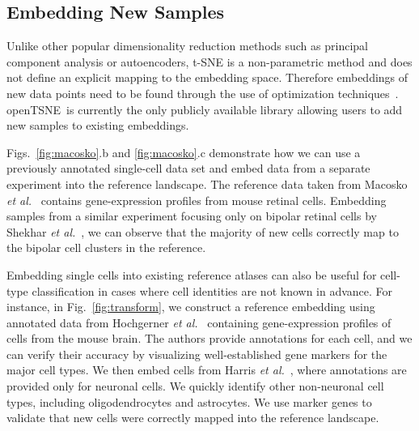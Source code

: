 \documentclass[twocolumn]{bmcart}
\newcommand{\opentsne}{\textsf{openTSNE}}
\begin{document}
\subsection*{Embedding New Samples}

Unlike other popular dimensionality reduction methods such as principal
component analysis or autoencoders, t-SNE is a non-parametric method and does
not define an explicit mapping to the embedding space. Therefore embeddings of
new data points need to be found through the use of optimization
techniques~\cite{policar2019embedding}. \opentsne\ is currently the only
publicly available library allowing users to add new samples to existing
embeddings.

Figs.~\ref{fig:macosko}.b and \ref{fig:macosko}.c demonstrate how we can use a
previously annotated single-cell data set and embed data from a separate
experiment into the reference landscape. The reference data taken from Macosko
\textit{et al.}~\cite{macosko2015highly} contains gene-expression profiles from
mouse retinal cells. Embedding samples from a similar experiment focusing only
on bipolar retinal cells by Shekhar \textit{et
al.}~\cite{shekhar2016comprehensive}, we can observe that the majority of new
cells correctly map to the bipolar cell clusters in the reference.

Embedding single cells into existing reference atlases can also be useful for
cell-type classification in cases where cell identities are not known in
advance. For instance, in Fig.~\ref{fig:transform}, we construct a reference
embedding using annotated data from Hochgerner \textit{et
al.}~\cite{hochgerner2018conserved} containing gene-expression profiles of
cells from the mouse brain. The authors provide annotations for each cell, and
we can verify their accuracy by visualizing well-established gene markers for the
major cell types. We then embed cells from Harris \textit{et
al.}~\cite{harris2018classes}, where annotations are provided only for neuronal
cells. We quickly identify other non-neuronal cell types, including
oligodendrocytes and astrocytes. We use marker genes to validate that new cells
were correctly mapped into the reference landscape.
\end{document}

